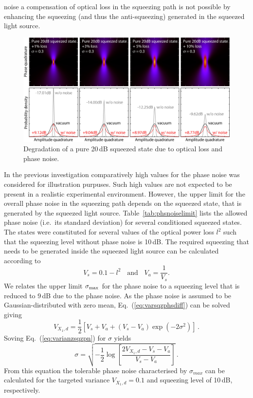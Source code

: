 noise a compensation of optical loss in the  squeezing path is not possible by enhancing the  squeezing (and thus the anti-squeezing) generated in the squeezed light source.

\begin{figure}
\centering
\includegraphics[scale=0.77]{./Sec_Optics/Wig_20dB_loss.jpg}
\caption{Degradation of a pure 20\,dB squeezed state due to optical loss and phase noise.}
\label{fig:phasediffusedSQZ20dB}
\end{figure}


In the previous investigation comparatively high values for the phase noise was considered for illustration purpuses. Such high values are not expected to be present in a realistic experimental environment. However, the upper limit for the overall phase noise in the squeezing path depends on the squeezed state, that is generated by the squeezed light source. Table~\ref{tab:phsnoiselimit} lists the allowed phase noise (i.e.\ its standard deviation) for several conditioned squeezed states. The states were constituted for several values of the optical power  loss $l^2$ such that the  squeezing level without phase noise is 10\,dB. The required squeezing  that needs to be generated inside the squeezed light source can be calculated according to
\begin{equation}
V_s = 0.1 -l^2\hspace{11pt}\text{and}\hspace{11pt}V_a = \frac{1}{V_s}.
\end{equation}
We relates the upper limit $\sigma_{\rm max}$ for the phase noise to a squeezing level that is reduced to 9\,dB due to the phase noise. As the phase noise is assumed to be Gaussian-distributed with zero mean, Eq.~(\ref{eq:varsqzphsdiff}) can be solved giving
\begin{equation}
V_{X_1,d} = \frac{1}{2}\left[V_s+V_a+(V_s-V_a)\exp\left(-2\sigma^2\right)\right]\,.\label{eq:varianzsqzpn}
\end{equation}
Soving Eq.~(\ref{eq:varianzsqzpn}) for $\sigma$ yields
\begin{equation}
\sigma = \sqrt{-\frac{1}{2}\log\left[\frac{2V_{X_1,d}-V_s-V_a}{V_s-V_a}\right]}\,.
\end{equation}
From this equation the tolerable phase noise characterised  by $\sigma_{max}$ can be calculated for the targeted variance  $V_{X_1,d}=0.1$ and squeezing level of 10\,dB, respectively.


